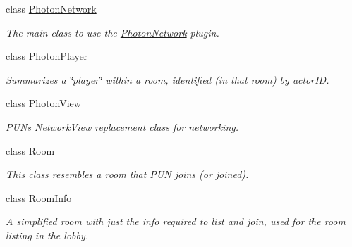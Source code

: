\begin{DoxyCompactItemize}
class \hyperlink{class_photon_network}{Photon\+Network}
\begin{DoxyCompactList}\small\item\em The main class to use the \hyperlink{class_photon_network}{Photon\+Network} plugin. \end{DoxyCompactList}\item 
class \hyperlink{class_photon_player}{Photon\+Player}
\begin{DoxyCompactList}\small\item\em Summarizes a \char`\"{}player\char`\"{} within a room, identified (in that room) by actor\+ID. \end{DoxyCompactList}\item 
class \hyperlink{class_photon_view}{Photon\+View}
\begin{DoxyCompactList}\small\item\em P\+UN\textquotesingle{}s Network\+View replacement class for networking. \end{DoxyCompactList}\item 
class \hyperlink{class_room}{Room}
\begin{DoxyCompactList}\small\item\em This class resembles a room that P\+UN joins (or joined). \end{DoxyCompactList}\item 
class \hyperlink{class_room_info}{Room\+Info}
\begin{DoxyCompactList}\small\item\em A simplified room with just the info required to list and join, used for the room listing in the lobby. \end{DoxyCompactList}\end{DoxyCompactItemize}
